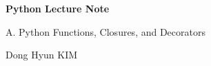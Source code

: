 \documentclass[a4paper,11pt]{article}
\begin{document}

\begin{titlepage}
    \centering
    \vspace*{\fill}

    {\Huge\bfseries Python Lecture Note\par}

    \vspace{1cm}

    {\Large A. Python Functions, Closures, and Decorators\par}

    \vspace{0.5cm}

    {\large Dong Hyun KIM\par}

    \vspace*{\fill}
\end{titlepage}



\end{document}
